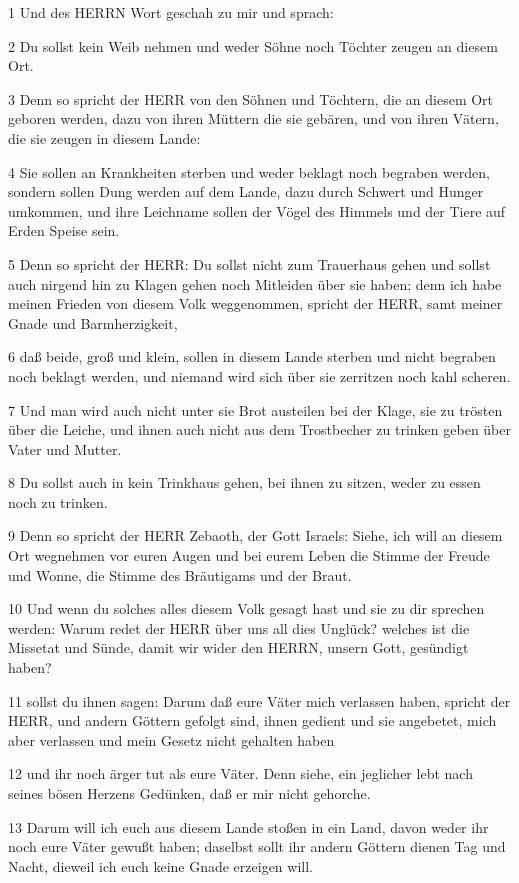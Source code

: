 \par 1 Und des HERRN Wort geschah zu mir und sprach:
\par 2 Du sollst kein Weib nehmen und weder Söhne noch Töchter zeugen an diesem Ort.
\par 3 Denn so spricht der HERR von den Söhnen und Töchtern, die an diesem Ort geboren werden, dazu von ihren Müttern die sie gebären, und von ihren Vätern, die sie zeugen in diesem Lande:
\par 4 Sie sollen an Krankheiten sterben und weder beklagt noch begraben werden, sondern sollen Dung werden auf dem Lande, dazu durch Schwert und Hunger umkommen, und ihre Leichname sollen der Vögel des Himmels und der Tiere auf Erden Speise sein.
\par 5 Denn so spricht der HERR: Du sollst nicht zum Trauerhaus gehen und sollst auch nirgend hin zu Klagen gehen noch Mitleiden über sie haben; denn ich habe meinen Frieden von diesem Volk weggenommen, spricht der HERR, samt meiner Gnade und Barmherzigkeit,
\par 6 daß beide, groß und klein, sollen in diesem Lande sterben und nicht begraben noch beklagt werden, und niemand wird sich über sie zerritzen noch kahl scheren.
\par 7 Und man wird auch nicht unter sie Brot austeilen bei der Klage, sie zu trösten über die Leiche, und ihnen auch nicht aus dem Trostbecher zu trinken geben über Vater und Mutter.
\par 8 Du sollst auch in kein Trinkhaus gehen, bei ihnen zu sitzen, weder zu essen noch zu trinken.
\par 9 Denn so spricht der HERR Zebaoth, der Gott Israels: Siehe, ich will an diesem Ort wegnehmen vor euren Augen und bei eurem Leben die Stimme der Freude und Wonne, die Stimme des Bräutigams und der Braut.
\par 10 Und wenn du solches alles diesem Volk gesagt hast und sie zu dir sprechen werden: Warum redet der HERR über uns all dies Unglück? welches ist die Missetat und Sünde, damit wir wider den HERRN, unsern Gott, gesündigt haben?
\par 11 sollst du ihnen sagen: Darum daß eure Väter mich verlassen haben, spricht der HERR, und andern Göttern gefolgt sind, ihnen gedient und sie angebetet, mich aber verlassen und mein Gesetz nicht gehalten haben
\par 12 und ihr noch ärger tut als eure Väter. Denn siehe, ein jeglicher lebt nach seines bösen Herzens Gedünken, daß er mir nicht gehorche.
\par 13 Darum will ich euch aus diesem Lande stoßen in ein Land, davon weder ihr noch eure Väter gewußt haben; daselbst sollt ihr andern Göttern dienen Tag und Nacht, dieweil ich euch keine Gnade erzeigen will.
